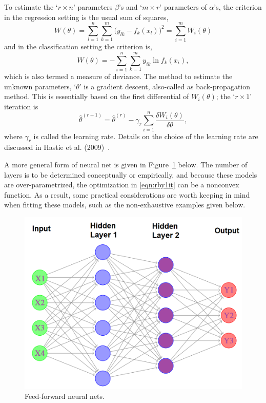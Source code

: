 To estimate the `$r \times n$' parameters $\beta$'s and `$m \times r$' parameters of $\alpha$'s, the criterion in the regression setting is the usual sum of squares,
	\begin{equation} \label{eqn:bigwtheta}
	W(\theta)= \sum_{l=1}^n \sum_{k=1}^m \big(y_{lk} - f_k(x_l)\big)^2 = \sum_{i=1}^m W_i(\theta)
	\end{equation}
and in the classification setting the criterion is, 
	\begin{equation} \label{eqn:bigwtheta2}
	W(\theta)= - \sum_{i=1}^n \sum_{k=1}^m y_{ik} \ln f_k(x_i),
	\end{equation}
which is also termed a measure of deviance. The method to estimate the unknown parameters, `$\theta$' is a gradient descent, also-called as back-propagation method. This is essentially based on the first differential of $W_i(\theta)$; the `$r \times 1$' iteration is
	\begin{equation} \label{eqn:rby1it}
	\hat{\theta}^{(r+1)}= \hat{\theta}^{(r)} - \gamma_r \sum_{i=1}^n \dfrac{\delta W_i(\theta)}{\delta \theta},
	\end{equation}
where $\gamma_r$ is called the learning rate. Details on the choice of the learning rate are discussed in Hastie et al. (2009)~\cite{hastibf}. 


A more general form of neural net is given in Figure~\ref{fig:neural_net} below. The number of layers is to be determined conceptually or empirically, and because these models are over-parametrized, the optimization in \eqref{eqn:rby1it} can be a nonconvex function. As a result, some practical considerations are worth keeping in mind when fitting these models, such as the non-exhaustive examples given below. 


	\begin{figure}[!ht]
	\centering
	\includegraphics[width=\textwidth]{chapters/chapter_advanced/figures/input_output.png}
	\caption{Feed-forward neural nets. \label{fig:neural_net}}
	\end{figure}


